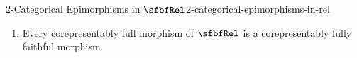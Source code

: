 \begin{proposition}{2-Categorical Epimorphisms in $\sfbfRel$}{2-categorical-epimorphisms-in-rel}
\begin{enumerate}
\begin{enumerate}
                \item\label{2-categorical-epimorphisms-in-rel-corepresentably-full-morphisms-in-rel-5}The functor
                    \[
                        R_{-1}%
                        \colon%
                        (\mathcal{P}(B),\subset)%
                        \to%
                        (\mathcal{P}(A),\subset)%
                    \]%
                    is full.
                \item\label{2-categorical-epimorphisms-in-rel-corepresentably-full-morphisms-in-rel-6}For each $U,V\in\mathcal{P}(B)$, if $R_{-1}(U)\subset R_{-1}(V)$, then $U\subset V$.
            \end{enumerate}
        \item\label{2-categorical-epimorphisms-in-rel-corepresentably-fully-faithful-morphisms-in-rel}Every corepresentably full morphism of $\sfbfRel$ is a corepresentably fully faithful morphism.
    \end{enumerate}
\end{proposition}
